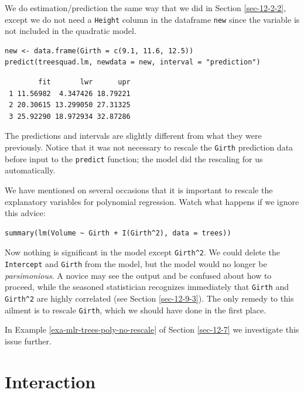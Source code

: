 \documentclass[captions=tableheading]{scrbook}
\begin{document}
We do estimation/prediction the same way that we did in Section \ref{sec-12-2-2}, except we do not need a \texttt{Height} column in the dataframe \texttt{new} since the variable is not included in the quadratic model.


\begin{verbatim}
new <- data.frame(Girth = c(9.1, 11.6, 12.5))
predict(treesquad.lm, newdata = new, interval = "prediction")
\end{verbatim}

\begin{verbatim}
        fit       lwr      upr
 1 11.56982  4.347426 18.79221
 2 20.30615 13.299050 27.31325
 3 25.92290 18.972934 32.87286
\end{verbatim}

The predictions and intervals are slightly different from what they were previously. Notice that it was not necessary to rescale the \texttt{Girth} prediction data before input to the \texttt{predict} function; the model did the rescaling for us automatically.

\begin{rem}
We have mentioned on several occasions that it is important to rescale the explanatory variables for polynomial regression. Watch what happens if we ignore this advice:


\begin{verbatim}
summary(lm(Volume ~ Girth + I(Girth^2), data = trees))
\end{verbatim}

Now nothing is significant in the model except \texttt{Girth\textasciicircum{}2}. We could delete the \texttt{Intercept} and \texttt{Girth} from the model, but the model would no longer be \emph{parsimonious}. A novice may see the output and be confused about how to proceed, while the seasoned statistician recognizes immediately that \texttt{Girth} and \texttt{Girth\textasciicircum{}2} are highly correlated (see Section \ref{sec-12-9-3}). The only remedy to this ailment is to rescale \texttt{Girth}, which we should have done in the first place.

In Example \ref{exa-mlr-trees-poly-no-rescale} of Section \ref{sec-12-7} we investigate this issue further.

\end{rem}
\section{Interaction}
\label{sec-12-5}
\label{sec-Interaction}
\end{document}

